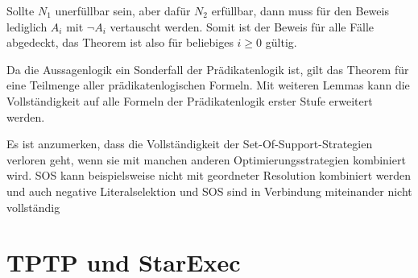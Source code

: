 Sollte $N_1$ unerfüllbar sein, aber dafür $N_2$ erfüllbar, dann muss für den Beweis lediglich $A_i$ mit $\neg A_i$ vertauscht werden. Somit ist der Beweis für alle Fälle abgedeckt, das Theorem ist also für beliebiges $i \geq 0$ gültig.

Da die Aussagenlogik ein Sonderfall der Prädikatenlogik ist, gilt das Theorem für eine Teilmenge aller prädikatenlogischen Formeln. Mit weiteren Lemmas kann die Vollständigkeit auf alle Formeln der Prädikatenlogik erster Stufe erweitert werden. \cite{Wos1965Sos}
		
Es ist anzumerken, dass die Vollständigkeit der Set-Of-Support-Strategien verloren geht, wenn sie mit manchen anderen Optimierungsstrategien kombiniert wird. SOS kann beispielsweise nicht mit geordneter Resolution kombiniert werden \cite{Sutcliffe2010Progress} und auch negative Literalselektion und SOS sind in Verbindung miteinander nicht vollständig \cite{nalon2016resolution}
		
	\section{TPTP und StarExec}
	\label{section:2StarexecTPTP}
	
